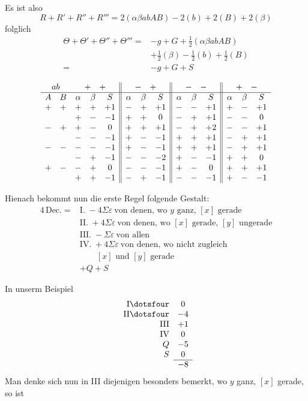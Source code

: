 Es ist also
\[
R+R'+R''+R'''=2(\alpha\beta abAB)-2(b)+2(B)+2(\beta)
\]
folglich
\[
\begin{aligned}
\Theta+\Theta'+\Theta''+\Theta'''={}&-g+G+\tfrac12(\alpha\beta abAB)\\
&+\tfrac12(\beta)-\tfrac12(b)+\tfrac12(B)\\
={}&-g+G+S
\end{aligned}
\]

\begingroup\small\setlength{\arraycolsep}{2.6pt}
\[
\begin{array}{ccccc||ccc||ccc||ccc}
\multicolumn{2}{c}{ab}&\multicolumn{3}{c||}{+\quad+}&\multicolumn{3}{c||}{-\quad+}&\multicolumn{3}{c||}{-\quad-}&\multicolumn{3}{c}{+\quad-}\\\hline
A&B&\alpha&\beta&S&\alpha&\beta&S&\alpha&\beta&S&\alpha&\beta&S\\
+&+&+&+&+1&-&+&+1&-&-&+1&+&-&+1\\
&&+&-&-1&+&+&0&-&+&+1&-&-&0\\
-&+&+&-&0&+&+&+1&-&+&+2&-&-&+1\\
&&-&-&-1&+&-&-1&+&+&+1&-&+&+1\\
-&-&-&-&-1&+&-&-1&+&+&+1&-&+&+1\\
&&-&+&-1&-&-&-2&+&-&-1&+&+&0\\
+&-&-&+&0&-&-&-1&+&-&0&+&+&+1\\
&&+&+&-1&-&+&-1&-&-&-1&+&-&-1\\
\end{array}
\]
\endgroup

Hienach bekommt nun die erste Regel folgende Gestalt:
\[
\begin{aligned}
4\,\text{Dec.}={}&\text{I.}\;-4\Sigma\varepsilon\ \text{von denen, wo }y\text{ ganz, }[x]\text{ gerade}\\
&\text{II.}\;+4\Sigma\varepsilon\ \text{von denen, wo }[x]\text{ gerade, }[y]\text{ ungerade}\\
&\text{III.}\;-\Sigma\varepsilon\ \text{von allen}\\
&\text{IV.}\;+4\Sigma\varepsilon\ \text{von denen, wo nicht zugleich}\\
&\qquad [x]\text{ und }[y]\text{ gerade}\\
&+Q+S
\end{aligned}
\]

In unserm Beispiel
\[
\begin{array}{rc}
\mathrm{I}\dotsfour&0\\
\mathrm{II}\dotsfour&-4\\
\mathrm{III}&+1\\
\mathrm{IV}&0\\
Q&-5\\
S&0\\\cline{2-2}
&-8
\end{array}
\]
Man denke sich nun in III diejenigen besonders bemerkt, wo $y$ ganz, $[x]$ gerade, so ist

